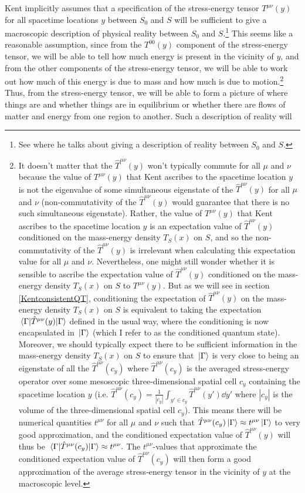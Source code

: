 Kent implicitly assumes that a specification of the stress-energy tensor $T^{\mu\nu}(y)$ for all spacetime locations $y$ between $S_0$ and $S$ will be sufficient to give a macroscopic description of physical reality between $S_0$ and $S$.\footnote{See \cite[2]{Kent2014} where he talks about giving a description of reality between $S_0$ and $S$.} This seems like a reasonable assumption, since from the $T^{00}(y)$ component of the stress-energy tensor, we will be able to tell how much energy is present in the vicinity of $y$, and from the other components of the stress-energy tensor, we will be able to work out how much of this energy is due to mass and how much is due to motion.\footnote{It doesn't matter that the  $\hat{T}^{\mu\nu}(y)$ won't typically commute for all $\mu$ and $\nu$ because the value of $T^{\mu\nu}(y)$ that Kent ascribes to the spacetime location $y$ is not the eigenvalue of some simultaneous eigenstate of the $\hat{T}^{\mu\nu}(y)$ for all $\mu$ and $\nu$ (non-commutativity of the $\hat{T}^{\mu\nu}(y)$ would guarantee that there is no such simultaneous eigenstate). Rather, the value of $T^{\mu\nu}(y)$ that Kent ascribes to the spacetime location $y$ is an expectation value of  $\hat{T}^{\mu\nu}(y)$ conditioned on the mass-energy density $T_S(x)$ on $S$, and so the non-commutativity of the $\hat{T}^{\mu\nu}(y)$ is irrelevant when calculating this expectation value  for all $\mu$ and $\nu$. Nevertheless, one might still wonder whether it is sensible to ascribe the   expectation value of  $\hat{T}^{\mu\nu}(y)$ conditioned on the mass-energy density $T_S(x)$ on $S$ to $T^{\mu\nu}(y)$. But as we will see in section \ref{KentconsistentQT}, conditioning the expectation of $\hat{T}^{\mu\nu}(y)$ on the mass-energy density $T_S(x)$ on $S$ is equivalent to taking the expectation $\ev*{ \hat{T}^{\mu\nu}(y)}{\Gamma}$ defined in the usual way, where the conditioning is now encapsulated in $\ket*{\Gamma}$ (which I refer to as the conditioned quantum state). Moreover, we should typically expect there to be sufficient information in the mass-energy density $T_S(x)$ on $S$ to ensure that $\ket*{\Gamma}$ is very close to being an eigenstate of all the $\hat{T}^{\mu\nu}(c_y)$ where $\hat{T}^{\mu\nu}(c_y)$ is the averaged stress-energy operator over some mesoscopic three-dimensional spatial cell $c_y$ containing the spacetime location $y$ (i.e.  $\hat{T}^{\mu\nu}(c_y)=\frac{1}{|c_y|}\int_{y'\in c_y} \hat{T}^{\mu\nu}(y')\dd y'$ where $|c_y|$ is the volume of the  three-dimensional spatial cell $c_y$). This means there will be numerical quantities $t^{\mu\nu}$ for all $\mu$ and $\nu$ such that $\hat{T}^{\mu\nu}(c_y)\ket*{\Gamma}\approx t^{\mu\nu}\ket*{\Gamma}$ to very good approximation,  and the conditioned expectation value of $\hat{T}^{\mu\nu}(y)$ will thus be $\ev*{ \hat{T}^{\mu\nu}(c_y)}{\Gamma}\approx t^{\mu\nu}.$   The $t^{\mu\nu}$-values that approximate the  conditioned expectation value of $\hat{T}^{\mu\nu}(c_y)$ will then form a  good approximation of the average stress-energy tensor in the vicinity of $y$ at the macroscopic level.} Thus, from the stress-energy tensor, we will be able to form a picture of where things are and whether things are in equilibrium or whether there are flows of matter and energy from one region to another. Such a description of reality will 